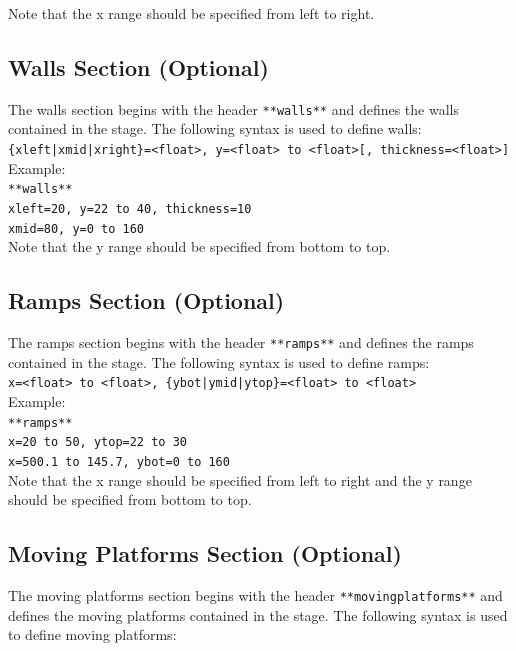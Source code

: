 \documentclass[12pt, titlepage]{article}
\begin{document}
\noindent Note that the x range should be specified from left to right.

\newpage
\subsection{Walls Section (Optional)}
The walls section begins with the header \texttt{**walls**} and defines the walls contained in the stage.  The following syntax is used to define walls:\\

\noindent ${}$\qquad \texttt{\{xleft|xmid|xright\}=<float>, y=<float> to <float>[, thickness=<float>]}\\

\noindent Example:\\

\noindent ${}$\qquad \texttt{**walls**}\\
${}$\qquad \texttt{xleft=20, y=22 to 40, thickness=10}\\
${}$\qquad \texttt{xmid=80, y=0 to 160}\\

\noindent Note that the y range should be specified from bottom to top.

\subsection{Ramps Section (Optional)}
The ramps section begins with the header \texttt{**ramps**} and defines the ramps contained in the stage.  The following syntax is used to define ramps:\\

\noindent ${}$\qquad \texttt{x=<float> to <float>, \{ybot|ymid|ytop\}=<float> to <float>}\\

\noindent Example:\\

\noindent ${}$\qquad \texttt{**ramps**}\\
${}$\qquad \texttt{x=20 to 50, ytop=22 to 30}\\
${}$\qquad \texttt{x=500.1 to 145.7, ybot=0 to 160}\\

\noindent Note that the x range should be specified from left to right and the y range should be specified from bottom to top.

\newpage
\subsection{Moving Platforms Section (Optional)}
The moving platforms section begins with the header \texttt{**movingplatforms**} and defines the moving platforms contained in the stage.  The following syntax is used to define moving platforms:\\
\end{document}
